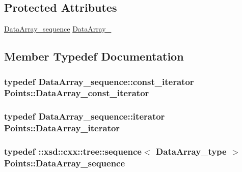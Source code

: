 \subsection*{Protected Attributes}
\begin{DoxyCompactItemize}
\item 
\hyperlink{classPoints_ac8b51dcf0e7659ca61ff9b9d24051016}{Data\+Array\+\_\+sequence} \hyperlink{classPoints_aaefb5f68ce6dbd9813458e3dfabca626}{Data\+Array\+\_\+}
\end{DoxyCompactItemize}


\subsection{Member Typedef Documentation}
\subsubsection[{\texorpdfstring{Data\+Array\+\_\+const\+\_\+iterator}{DataArray_const_iterator}}]{\setlength{\rightskip}{0pt plus 5cm}typedef Data\+Array\+\_\+sequence\+::const\+\_\+iterator {\bf Points\+::\+Data\+Array\+\_\+const\+\_\+iterator}}\hypertarget{classPoints_a795a395909c3360569fe0e854ba6059e}{}\label{classPoints_a795a395909c3360569fe0e854ba6059e}
\subsubsection[{\texorpdfstring{Data\+Array\+\_\+iterator}{DataArray_iterator}}]{\setlength{\rightskip}{0pt plus 5cm}typedef Data\+Array\+\_\+sequence\+::iterator {\bf Points\+::\+Data\+Array\+\_\+iterator}}\hypertarget{classPoints_ac4cd7a177b464c1e08d493600a7e6e16}{}\label{classPoints_ac4cd7a177b464c1e08d493600a7e6e16}
\subsubsection[{\texorpdfstring{Data\+Array\+\_\+sequence}{DataArray_sequence}}]{\setlength{\rightskip}{0pt plus 5cm}typedef \+::xsd\+::cxx\+::tree\+::sequence$<$ {\bf Data\+Array\+\_\+type} $>$ {\bf Points\+::\+Data\+Array\+\_\+sequence}}\hypertarget{classPoints_ac8b51dcf0e7659ca61ff9b9d24051016}{}\label{classPoints_ac8b51dcf0e7659ca61ff9b9d24051016}

